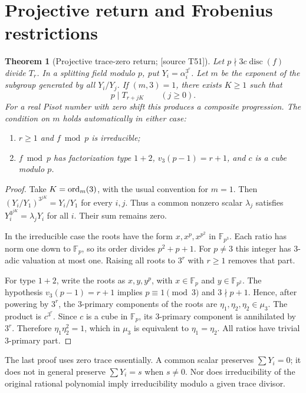 \documentclass[11pt,a4paper]{article}
\newtheorem{theorem}{Theorem}[section]
\theoremstyle{definition}\newtheorem{definition}[theorem]{Definition}
\theoremstyle{remark}\newtheorem{remark}[theorem]{Remark}
\newcommand{\sourceT}[1]{\textup{[source T#1]}}
\begin{document}
\section{Projective return and Frobenius restrictions}
\begin{theorem}[Projective trace-zero return; \sourceT{51}]\label{thm:projective}
Let $p\nmid3c\operatorname{disc}(f)$ divide $T_r$. In a splitting field modulo $p$, put $Y_i=\alpha_i^{3^r}$. Let $m$ be the exponent of the subgroup generated by all $Y_i/Y_j$. If $(m,3)=1$, there exists $K\ge1$ such that
\[
 p\mid T_{r+jK}\qquad(j\ge0).
\]
For a real Pisot number with zero shift this produces a composite progression. The condition on $m$ holds automatically in either case:
\begin{enumerate}[label=(\roman*)]
\item $r\ge1$ and $f\bmod p$ is irreducible;
\item $f\bmod p$ has factorization type $1+2$, $v_3(p-1)=r+1$, and $c$ is a cube modulo $p$.
\end{enumerate}
\end{theorem}
\begin{proof}
Take $K=\operatorname{ord}_m(3)$, with the usual convention for $m=1$. Then
$(Y_i/Y_1)^{3^{jK}}=Y_i/Y_1$ for every $i,j$. Thus a common nonzero scalar $\lambda_j$ satisfies $Y_i^{3^{jK}}=\lambda_jY_i$ for all $i$. Their sum remains zero.

In the irreducible case the roots have the form $x,x^p,x^{p^2}$ in $\mathbb F_{p^3}$. Each ratio has norm one down to $\mathbb F_p$, so its order divides $p^2+p+1$. For $p\ne3$ this integer has $3$-adic valuation at most one. Raising all roots to $3^r$ with $r\ge1$ removes that part.

For type $1+2$, write the roots as $x,y,y^p$, with $x\in\mathbb F_p$ and $y\in\mathbb F_{p^2}$. The hypothesis $v_3(p-1)=r+1$ implies $p\equiv1\pmod3$ and $3\nmid p+1$. Hence, after powering by $3^r$, the $3$-primary components of the roots are $\eta_1,\eta_2,\eta_2\in\mu_3$. The product is $c^{3^r}$. Since $c$ is a cube in $\mathbb F_p$, its $3$-primary component is annihilated by $3^r$. Therefore $\eta_1\eta_2^2=1$, which in $\mu_3$ is equivalent to $\eta_1=\eta_2$. All ratios have trivial $3$-primary part.
\end{proof}
The last proof uses zero trace essentially. A common scalar preserves $\sum Y_i=0$; it does not in general preserve $\sum Y_i=s$ when $s\ne0$. Nor does irreducibility of the original rational polynomial imply irreducibility modulo a given trace divisor.
\end{document}

